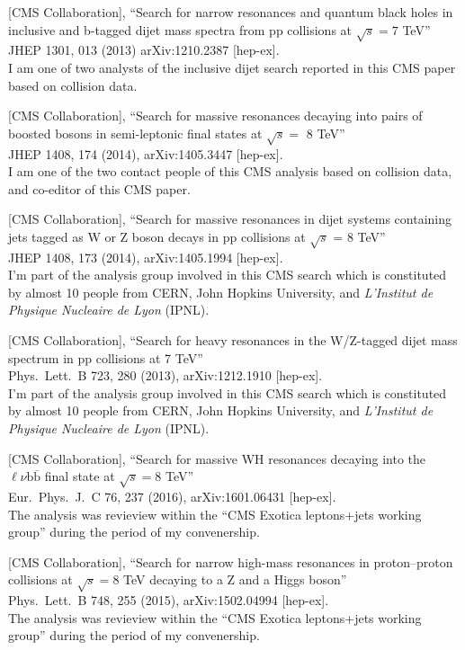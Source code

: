 \documentclass[10pt, a4paper]{article}
\begin{document}
\begin{thebibliography}{599}
[CMS Collaboration],
 ``Search for narrow resonances and quantum black holes in inclusive and b-tagged dijet mass spectra from pp collisions at $\sqrt{s}=7$ TeV''\\
 JHEP 1301, 013 (2013) arXiv:1210.2387 [hep-ex].
 \\ I am one of two analysts of the inclusive dijet search reported in this CMS paper based on collision data.

[CMS Collaboration],
 ``Search for massive resonances decaying into pairs of boosted bosons in semi-leptonic final states at $\sqrt{s} =$ 8 TeV''\\
  JHEP 1408, 174 (2014), arXiv:1405.3447 [hep-ex].
  \\I am one of the two contact people of this CMS analysis based on collision data, and co-editor of this CMS paper.

[CMS Collaboration],
``Search for massive resonances in dijet systems containing jets
   tagged as W or Z boson decays in pp collisions at $ \sqrt{s} $ = 8 TeV''\\ 
JHEP 1408, 173 (2014), arXiv:1405.1994 [hep-ex].
 \\ I'm part of the analysis group involved in this CMS search which is constituted by almost 10 people from CERN, John Hopkins University, and \textit{L'Institut de Physique Nucleaire de Lyon} (IPNL).

[CMS Collaboration],
 ``Search for heavy resonances in the W/Z-tagged dijet mass spectrum in pp collisions at 7 TeV''\\
Phys.\ Lett.\ B 723, 280 (2013), arXiv:1212.1910 [hep-ex].
 \\ I'm part of the analysis group involved in this CMS search which
 is constituted by almost 10 people from CERN, John Hopkins
 University, and \textit{L'Institut de Physique Nucleaire de Lyon}
 (IPNL).

[CMS Collaboration],
 ``Search for massive WH resonances decaying into the $\ell \nu \mathrm{b} \overline{\mathrm{b}} $ final state at $\sqrt{s}=8$ TeV''\\
  Eur.\ Phys.\ J.\ C 76, 237 (2016), arXiv:1601.06431 [hep-ex].\\
The analysis was revieview within the ``CMS Exotica leptons+jets working group'' during
the period of my convenership.

 [CMS Collaboration],
 ``Search for narrow high-mass resonances in proton–proton collisions at $\sqrt{s}=8$ TeV decaying to a Z and a Higgs boson''\\
  Phys.\ Lett.\ B 748, 255 (2015), arXiv:1502.04994 [hep-ex].\\
The analysis was revieview within the ``CMS Exotica leptons+jets working group'' during
the period of my convenership.


\end{thebibliography}
\end{document}
